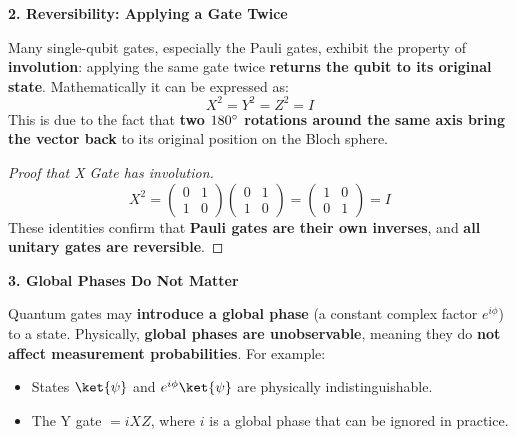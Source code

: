 \highspace
\begin{flushleft}
    \textcolor{Green3}{\textbf{2. Reversibility: Applying a Gate Twice}}
\end{flushleft}
Many single-qubit gates, especially the Pauli gates, exhibit the property of \textbf{involution}: applying the same gate twice \textbf{returns the qubit to its original state}. Mathematically it can be expressed as:
\begin{equation*}
    X^{2} = Y^{2} = Z^{2} = I
\end{equation*}
This is due to the fact that \textbf{two $180^\circ$ rotations around the same axis bring the vector back} to its original position on the Bloch sphere.

\begin{proof}[Proof that X Gate has involution]
    \begin{equation*}
        X^{2} =
        \begin{pmatrix}
            0 & 1 \\ 1 & 0
        \end{pmatrix}
        \begin{pmatrix}
            0 & 1 \\ 1 & 0
        \end{pmatrix}
        =
        \begin{pmatrix}
            1 & 0 \\ 0 & 1
        \end{pmatrix}
        =
        I
    \end{equation*}
    These identities confirm that \textbf{Pauli gates are their own inverses}, and \textbf{all unitary gates are reversible}.
\end{proof}

\highspace
\begin{flushleft}
    \textcolor{Green3}{\textbf{3. Global Phases Do Not Matter}}
\end{flushleft}
Quantum gates may \textbf{introduce a global phase} (a constant complex factor $e^{i\phi}$) to a state. Physically, \textbf{global phases are unobservable}, meaning they do \textbf{not affect measurement probabilities}. For example:
\begin{itemize}
    \item States $\ket{\psi}$ and $e^{i\phi}\ket{\psi}$ are physically indistinguishable.
    \item The Y gate $= iXZ$, where $i$ is a global phase that can be ignored in practice. 
\end{itemize}

